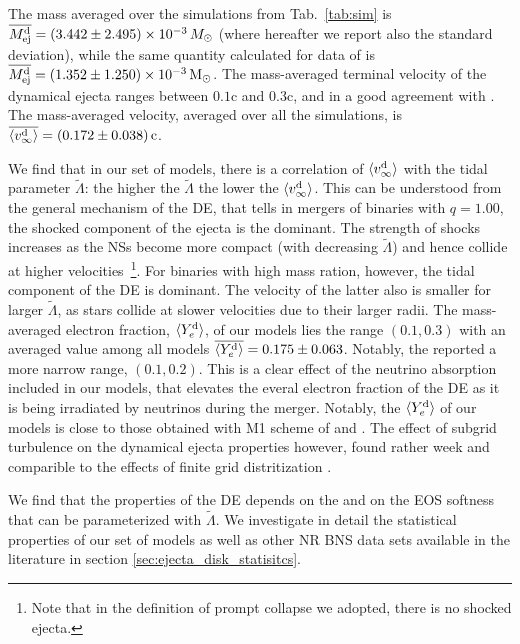 The mass averaged over the simulations from Tab.~\ref{tab:sim} is 
$\overline{M^{\text{d}}_{\text{ej}}} = (3.442 \pm 2.495)\times 10^{-3}\,M_{\odot}$ (where
hereafter we report also the standard deviation), while the same
quantity calculated for data of \cite{Radice:2018pdn} 
is $\overline{M^{\text{d}}_{\text{ej}}} = (1.352\pm 1.250)\times 10^{-3}\,{\text{M}_{\odot}}$.
The mass-averaged terminal velocity of the dynamical ejecta 
ranges between $0.1$c and $0.3$c, and in a good agreement with 
\cite{Radice:2018pdn}.
The mass-averaged velocity, averaged over all the simulations, is 
$\overline{\langle v^{\text{d}}_\infty\rangle} = (0.172\pm0.038)\,{\text{c}}$.

We find that in our set of models, there is a correlation of $\langle v^{\text{d}}_\infty\rangle$ with the tidal parameter 
$\tilde{\Lambda}$: the higher the $\tilde{\Lambda}$ the lower the $\langle v^{\text{d}}_\infty\rangle$.
This can be understood from the general mechanism of the \ac{DE},
that tells in mergers of binaries with $q=1.00$, the shocked component of the ejecta 
is the dominant. The strength of shocks increases as the \acp{NS} become more compact 
(with decreasing $\tilde{\Lambda}$) and hence collide at higher velocities~\footnote{Note that in the definition of prompt collapse we adopted, there is no shocked ejecta.}.
For binaries with high mass ration, however, the tidal component of the \ac{DE} is dominant. 
The velocity of the latter also is smaller for larger $\tilde{\Lambda}$, as stars collide 
at slower velocities due to their larger radii. 
The mass-averaged electron fraction, $\langle Y^{\text{d}}_{e}\rangle$, of our models lies the range $(0.1, 0.3)$
with an averaged value among all models $\overline{\langle Y^{\text{d}}_{e}\rangle} = 0.175 \pm 0.063$.
Notably, the \citet{Radice:2018pdn} reported a more narrow range, $(0.1, 0.2)$.
This is a clear effect of the neutrino absorption included in our models, that elevates 
the everal electron fraction of the \ac{DE} as it is being irradiated by neutrinos 
during the merger.
Notably, the $\langle Y^{\text{d}}_{e}\rangle$ of our models is close to those obtained with M1 
scheme of \citet{Sekiguchi:2016bjd} and \citet{Vincent:2019kor}.
The effect of subgrid turbulence on the dynamical ejecta properties however,
found rather week and comparible to the effects of finite grid distritization 
\citep{Bernuzzi:2020txg,Radice:2020ids}.

We find that the properties of the \ac{DE} depends on the \mr{} and on the 
\ac{EOS} softness that can be parameterized with $\tilde{\Lambda}$. 
We investigate in detail the statistical properties of our set of models as well as 
other \ac{NR} \ac{BNS} data sets available in the literature in 
section \ref{sec:ejecta_disk_statisitcs}.





